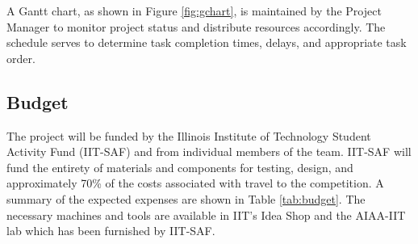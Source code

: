 A Gantt chart, as shown in Figure \ref{fig:gchart}, is maintained by the Project Manager to monitor project status and distribute resources accordingly. The schedule serves to determine task completion times, delays, and appropriate task order.
\subsection{Budget}
    The project will be funded by the Illinois Institute of Technology Student Activity Fund (IIT-SAF) and from individual members of the team. IIT-SAF will fund the entirety of materials and components for testing, design, and approximately 70\% of the costs associated with travel to the competition. A summary of the expected expenses are shown in Table \ref{tab:budget}. The necessary machines and tools are available in IIT's Idea Shop and the AIAA-IIT lab which has been furnished by IIT-SAF.
  

